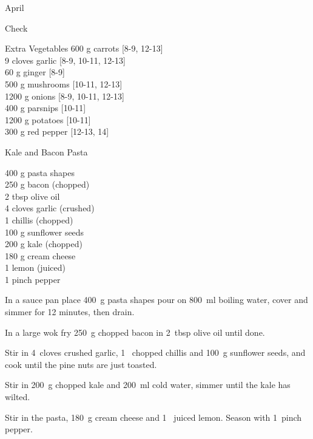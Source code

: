 \begin{menu}{April}
\begin{shoppinglist}{Check}
      \end{shoppinglist}%
      \begin{shoppinglist}{Extra Vegetables}
      600 g carrots {\scriptsize[8-9, 12-13]}\\
      9 cloves garlic {\scriptsize[8-9, 10-11, 12-13]}\\
      60 g ginger {\scriptsize[8-9]}\\
      500 g mushrooms {\scriptsize[10-11, 12-13]}\\
      1200 g onions {\scriptsize[8-9, 10-11, 12-13]}\\
      400 g parsnips {\scriptsize[10-11]}\\
      1200 g potatoes {\scriptsize[10-11]}\\
      300 g red pepper {\scriptsize[12-13, 14]}\\
      \end{shoppinglist}%
      \par\vfil %
    \vfil\clearpage
  
    \begin{recipe}{2}{Kale and Bacon Pasta}%
		\begin{ingredients}
		400 g pasta shapes  \\
	250 g bacon (chopped) \\
	2 tbsp olive oil  \\
	4 cloves garlic (crushed) \\
	1  chillis (chopped) \\
	100 g sunflower seeds  \\
	200 g kale (chopped) \\
	180 g cream cheese  \\
	1  lemon (juiced) \\
	1 pinch pepper  \\
	
		\end{ingredients}
	
	
    \begin{instructions}
    \item 
    In a
    sauce pan
    place
    400~g  pasta shapes
    pour on
    800~ml  boiling water,
    cover and simmer for 12 minutes, then drain.
  \item 
        In a large wok fry
        250~g chopped bacon
        in
        2~tbsp  olive oil
        until done.
      \item 
        Stir in
        4~cloves crushed garlic,
        1~ chopped chillis
        and
        100~g  sunflower seeds,
        and cook until the pine nuts are just toasted.
      \item 
        Stir in
        200~g chopped kale
        and
        200~ml  cold water,
        simmer until the kale has wilted.
      \item 
        Stir in the pasta,
        180~g  cream cheese
        and
        1~ juiced lemon.
        Season with
        1~pinch  pepper.
      

\end{instructions}
\end{recipe}
\end{menu}
